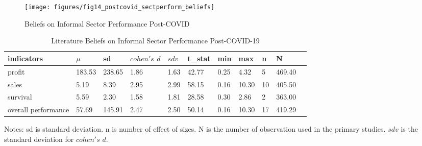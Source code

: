 \documentclass[12pt, english]{article}
\begin{document}
    \begin{figure}[H]
        \centering
        \texttt{[image: figures/fig14\_postcovid\_sectperform\_beliefs]}
        \caption{Beliefs on Informal Sector Performance Post-COVID}
        \label{fig9:beliefs-inf-sector-perform-postcovid}
    \end{figure}

    \begin{table}[H]
        \centering
        \caption{Literature Beliefs on Informal Sector Performance Post-COVID-19}
        \label{tab5:literature-beliefs-informal-postcovid}
        \begin{tabular}{lllllllllll}
            \toprule
            indicators          & $\mu$  & sd     & $cohen's$ $d$ & $sdv$ & t\_stat & min  & max   & n  & N      \\
            \midrule
            profit              & 183.53 & 238.65 & 1.86          & 1.63  & 42.77   & 0.25 & 4.32  & 5  & 469.40 \\
            sales               & 5.19   & 8.39   & 2.95          & 2.99  & 58.15   & 0.16 & 10.30 & 10 & 405.50 \\
            survival            & 5.59   & 2.30   & 1.58          & 1.81  & 28.58   & 0.30 & 2.86  & 2  & 363.00 \\
            overall performance & 57.69  & 145.91 & 2.47          & 2.50  & 50.14   & 0.16 & 10.30 & 17 & 419.29 \\
            \bottomrule
        \end{tabular}
        \begin{minipage}{17cm}
            \vspace{0.1cm}
            \small Notes: sd is standard deviation. n is number of effect of sizes. N is the number of observation used in the primary studies. $sdv$ is the standard deviation for $cohen's$ $d$.
        \end{minipage}
    \end{table}
\end{document}
